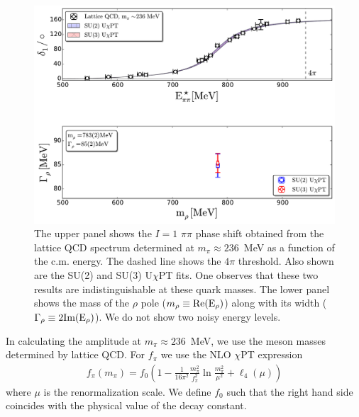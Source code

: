 \documentclass[twocolumn,hyperpdf,
amsmath,amssymb,
aps,prd,10pt,
superscriptaddress,nofootinbib,noeprint,preprintnumbers]{revtex4-1}
\begin{document}
\begin{figure}[t]
\begin{center}
\hspace*{-.7cm}                                                           
\includegraphics[scale=0.35]{figures/lattice_fits.pdf}
\caption{The upper panel shows the $I=1$ $\pi\pi$ phase shift obtained from the lattice QCD spectrum determined at $m_\pi\approx236$~MeV as a function of the c.m. energy. The dashed line shows the $4\pi$ threshold. Also shown are the SU(2) and SU(3) U$\chi$PT fits. One observes that these two results are indistinguishable at these quark masses. The lower panel shows the mass of the $\rho$ pole ($m_\rho\equiv\rm Re(E_\rho)$) along with its width ($\Gamma_\rho\equiv\rm 2 Im(E_\rho)$). We do not show two noisy energy levels.
}
\label{fig:lattice_fits}
\vspace*{-.6cm}
\end{center}
\end{figure}

In calculating the amplitude at $m_\pi\approx 236$~MeV, we use the meson masses determined by lattice QCD. For $f_\pi$ we use the NLO $\chi$PT expression~\cite{Gasser:1984gg,Gasser:1983yg,Gasser:1983kx}
\begin{align}
f_\pi(m_\pi)=f_0\left(1-\frac{1}{16\pi^2}\frac{m_\pi^2}{f_\pi^2}\ln\frac{m_\pi^2}{\mu^2}+\ell_4(\mu)\right)
\end{align}
where $\mu$ is the renormalization scale. We define $f_0$ such that the right hand side coincides with the physical value of the decay constant.  
\end{document}
